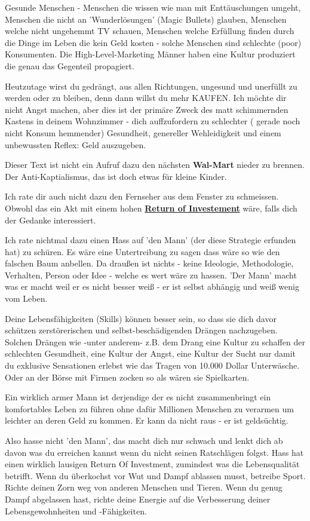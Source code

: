 \documentclass[10pt,a4paper,ngerman,twoside]{article} %
\begin{document}
Gesunde Menschen - Menschen die wissen wie man mit Enttäuschungen umgeht, Menschen die nicht an 'Wunderlösungen' (Magic Bullets) glauben, Menschen welche nicht ungehemmt TV schauen, Menschen welche Erfüllung finden durch die  Dinge im Leben die kein Geld kosten - solche Menschen sind schlechte (poor) Konsumenten. Die High-Level-Marketing Männer haben eine Kultur produziert die genau das Gegenteil propagiert.

Heutzutage wirst du gedrängt, aus allen Richtungen, ungesund und unerfüllt zu werden oder zu bleiben, denn dann willst du mehr KAUFEN. Ich möchte dir nicht Angst machen, aber dies ist der primäre Zweck des matt schimmernden Kastens in deinem Wohnzimmer - dich auffzufordern zu schlechter ( gerade noch nicht Konsum hemmender) Gesundheit, genereller Wehleidigkeit und einem unbewussten Reflex: Geld auszugeben. 

Dieser Text ist nicht ein Aufruf dazu den nächsten \textbf{Wal-Mart} nieder zu brennen. Der Anti-Kaptialismus, das  ist doch etwas für kleine Kinder.

Ich rate dir auch nicht dazu den Fernseher aus dem Fenster zu schmeissen. Obwohl das ein Akt mit einem hohen  \href{https://de.wikipedia.org/wiki/Return_on_Investment}{\textbf{Return of Investement}} wäre, falls dich der Gedanke interessiert. 

Ich rate nichtmal dazu einen Hass auf 'den Mann' (der diese Strategie erfunden hat) zu schüren. Es wäre eine Untertreibung zu sagen dass wäre so wie den falschen Baum anbellen. Da draußen ist nichts - keine Ideologie, Methodologie, Verhalten, Person oder Idee - welche es wert wäre zu hassen. 'Der Mann' macht was er macht weil er es nicht besser weiß - er ist selbst abhängig und weiß wenig vom Leben.

Deine Lebensfähigkeiten (Skills) können besser sein, so dass sie dich davor schützen zerstörerischen und selbst-beschädigenden Drängen nachzugeben. Solchen Drängen wie -unter anderem-  z.B. dem Drang eine Kultur zu schaffen der schlechten Gesundheit, eine Kultur der Angst, eine Kultur der Sucht nur damit du exklusive Sensationen erlebst wie das Tragen von 10.000 Dollar Unterwäsche. Oder an der Börse mit Firmen zocken so als wären sie Spielkarten. 

Ein wirklich armer Mann ist derjendige der es nicht zusammenbringt ein komfortables Leben zu führen ohne dafür Millionen Menschen zu verarmen um leichter an deren Geld zu kommen. Er kann da nicht raus - er ist geldsüchtig.

Also hasse nicht 'den Mann', das macht dich nur schwach und lenkt dich ab davon was du erreichen kannst wenn du nicht seinen Ratschlägen folgst. Hass hat einen wirklich lausigen Return Of Investment, zumindest was die Lebensqualität betrifft. Wenn du überkochst vor Wut und Dampf ablassen musst, betreibe Sport. Richte deinen Zorn weg von anderen Menschen und Tieren. Wenn du genug Dampf abgelassen hast, richte deine Energie auf die Verbesserung deiner Lebensgewohnheiten und -Fähigkeiten.
\end{document}
